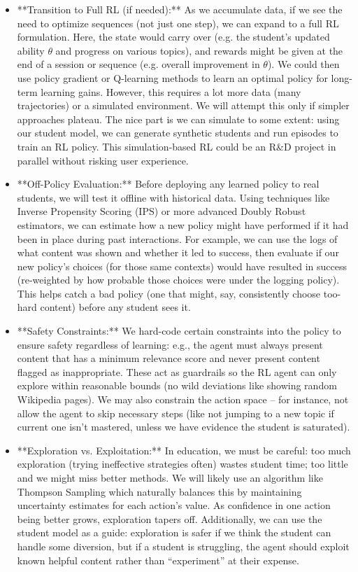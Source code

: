 \documentclass[11pt]{article}
\begin{document}
\begin{itemize}
  \item **Transition to Full RL (if needed):** As we accumulate data, if we see the need to optimize sequences (not just one step), we can expand to a full RL formulation. Here, the state would carry over (e.g. the student’s updated ability $\theta$ and progress on various topics), and rewards might be given at the end of a session or sequence (e.g. overall improvement in $\theta$). We could then use policy gradient or Q-learning methods to learn an optimal policy for long-term learning gains. However, this requires a lot more data (many trajectories) or a simulated environment. We will attempt this only if simpler approaches plateau. The nice part is we can simulate to some extent: using our student model, we can generate synthetic students and run episodes to train an RL policy. This simulation-based RL could be an R\&D project in parallel without risking user experience.
  \item **Off-Policy Evaluation:** Before deploying any learned policy to real students, we will test it offline with historical data. Using techniques like Inverse Propensity Scoring (IPS) or more advanced Doubly Robust estimators, we can estimate how a new policy might have performed if it had been in place during past interactions. For example, we can use the logs of what content was shown and whether it led to success, then evaluate if our new policy’s choices (for those same contexts) would have resulted in success (re-weighted by how probable those choices were under the logging policy). This helps catch a bad policy (one that might, say, consistently choose too-hard content) before any student sees it.
  \item **Safety Constraints:** We hard-code certain constraints into the policy to ensure safety regardless of learning: e.g., the agent must always present content that has a minimum relevance score and never present content flagged as inappropriate. These act as guardrails so the RL agent can only explore within reasonable bounds (no wild deviations like showing random Wikipedia pages). We may also constrain the action space – for instance, not allow the agent to skip necessary steps (like not jumping to a new topic if current one isn’t mastered, unless we have evidence the student is saturated).
  \item **Exploration vs. Exploitation:** In education, we must be careful: too much exploration (trying ineffective strategies often) wastes student time; too little and we might miss better methods. We will likely use an algorithm like Thompson Sampling which naturally balances this by maintaining uncertainty estimates for each action’s value. As confidence in one action being better grows, exploration tapers off. Additionally, we can use the student model as a guide: exploration is safer if we think the student can handle some diversion, but if a student is struggling, the agent should exploit known helpful content rather than “experiment” at their expense.

\end{itemize}
\end{document}
